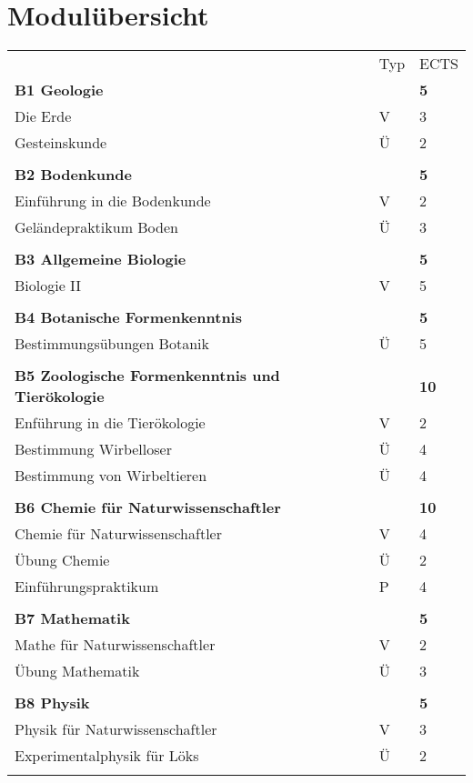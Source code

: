 \section{Modulübersicht}
\begin{longtable}{p{} p{} p{}}
 & Typ & ECTS \\ 
\textbf{B1 Geologie} & & \textbf{5}\\ 
Die Erde & V & 3\\
Gesteinskunde & Ü & 2\\
& &\\
\textbf{B2 Bodenkunde}& & \textbf{5}\\
Einführung in die Bodenkunde & V & 2\\
Geländepraktikum Boden & Ü & 3\\
& &\\
\textbf{B3 Allgemeine Biologie}& & \textbf{5}\\
Biologie II & V &5\\
& &\\
\textbf{B4 Botanische Formenkenntnis} & & \textbf{5}\\
Bestimmungsübungen Botanik & Ü & 5\\
& &\\
\textbf{B5 Zoologische Formenkenntnis und Tierökologie} & &\textbf{10}\\
Enführung in die Tierökologie & V & 2\\
Bestimmung Wirbelloser & Ü & 4\\
Bestimmung von Wirbeltieren & Ü & 4\\
& &\\
\textbf{B6 Chemie für Naturwissenschaftler} & & \textbf{10}\\
Chemie für Naturwissenschaftler & V & 4\\
Übung Chemie & Ü & 2\\
Einführungspraktikum & P & 4 \\
&&\\
\textbf{B7 Mathematik} & &\textbf{5}\\
Mathe für Naturwissenschaftler & V & 2\\
Übung Mathematik & Ü & 3\\
&&\\
\textbf{B8 Physik} & & \textbf{5}\\
Physik für Naturwissenschaftler & V & 3 \\
Experimentalphysik für Löks & Ü & 2\\
&&\\

\end{longtable}
